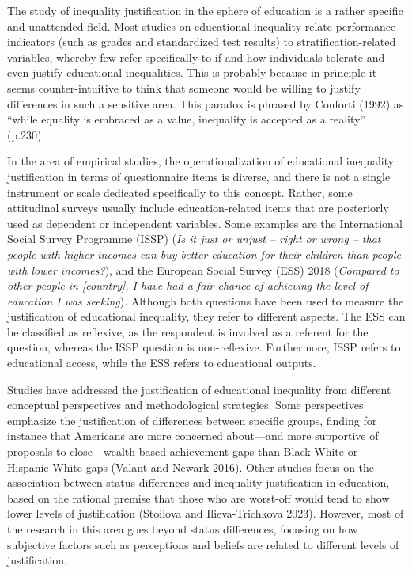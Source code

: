 \documentclass[
]{article}
\begin{document}
The study of inequality justification in the sphere of education is a
rather specific and unattended field. Most studies on educational
inequality relate performance indicators (such as grades and
standardized test results) to stratification-related variables, whereby
few refer specifically to if and how individuals tolerate and even
justify educational inequalities. This is probably because in principle
it seems counter-intuitive to think that someone would be willing to
justify differences in such a sensitive area. This paradox is phrased by
Conforti (1992) as ``while equality is embraced as a value, inequality
is accepted as a reality'' (p.230).

In the area of empirical studies, the operationalization of educational
inequality justification in terms of questionnaire items is diverse, and
there is not a single instrument or scale dedicated specifically to this
concept. Rather, some attitudinal surveys usually include
education-related items that are posteriorly used as dependent or
independent variables. Some examples are the International Social Survey
Programme (ISSP) (\emph{Is it just or unjust -- right or wrong -- that
people with higher incomes can buy better education for their children
than people with lower incomes?}), and the European Social Survey (ESS)
2018 (\emph{Compared to other people in {[}country{]}, I have had a fair
chance of achieving the level of education I was seeking}). Although
both questions have been used to measure the justification of
educational inequality, they refer to different aspects. The ESS can be
classified as reflexive, as the respondent is involved as a referent for
the question, whereas the ISSP question is non-reflexive. Furthermore,
ISSP refers to educational access, while the ESS refers to educational
outputs.

Studies have addressed the justification of educational inequality from
different conceptual perspectives and methodological strategies. Some
perspectives emphasize the justification of differences between specific
groups, finding for instance that Americans are more concerned
about---and more supportive of proposals to close---wealth-based
achievement gaps than Black-White or Hispanic-White gaps (Valant and
Newark 2016). Other studies focus on the association between status
differences and inequality justification in education, based on the
rational premise that those who are worst-off would tend to show lower
levels of justification (Stoilova and Ilieva-Trichkova 2023). However,
most of the research in this area goes beyond status differences,
focusing on how subjective factors such as perceptions and beliefs are
related to different levels of justification.
\end{document}

